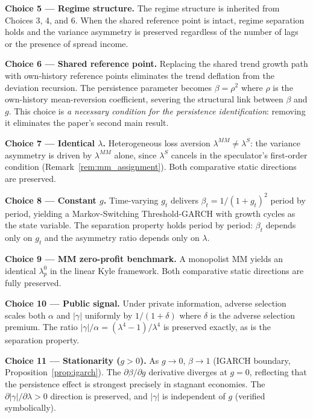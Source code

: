\documentclass[12pt,a4paper]{article}
\theoremstyle{definition}
\begin{document}
\noindent\textbf{Choice 5 --- Regime structure.} The regime structure is
inherited from Choices 3, 4, and 6. When the shared reference point is
intact, regime separation holds and the variance asymmetry is preserved
regardless of the number of lags or the presence of spread income.

\noindent\textbf{Choice 6 --- Shared reference point.} Replacing the
shared trend growth path with own-history reference points eliminates
the trend deflation from the deviation recursion. The
persistence parameter becomes $\beta = \rho^2$ where $\rho$ is the
own-history mean-reversion coefficient, severing the structural link
between $\beta$ and $g$. This choice is \emph{a necessary condition for the
persistence identification}: removing it eliminates the paper's second
main result.

\noindent\textbf{Choice 7 --- Identical $\lambda$.} Heterogeneous loss
aversion $\lambda^{MM} \neq \lambda^S$: the variance asymmetry is driven
by $\lambda^{MM}$ alone, since $\lambda^S$ cancels in the speculator's
first-order condition (Remark~\ref{rem:mm_assignment}). Both comparative
static directions are preserved.

\noindent\textbf{Choice 8 --- Constant $g$.} Time-varying $g_t$
delivers $\beta_t = 1/(1+g_t)^2$ period by period, yielding a
Markov-Switching Threshold-GARCH with growth cycles as the state variable.
The separation property holds period by period: $\beta_t$ depends only
on $g_t$ and the asymmetry ratio depends only on $\lambda$.

\noindent\textbf{Choice 9 --- MM zero-profit benchmark.} A monopolist MM
yields an identical $\lambda^0_p$ in the linear Kyle framework. Both
comparative static directions are fully preserved.

\noindent\textbf{Choice 10 --- Public signal.} Under private information,
adverse selection scales both $\alpha$ and $|\gamma|$ uniformly by
$1/(1+\delta)$ where $\delta$ is the adverse selection premium. The
ratio $|\gamma|/\alpha = (\lambda^4-1)/\lambda^4$ is preserved
exactly, as is the separation property.

\noindent\textbf{Choice 11 --- Stationarity ($g > 0$).} As $g \to 0$,
$\beta \to 1$ (IGARCH boundary, Proposition~\ref{prop:igarch}). The
$\partial\beta/\partial g$ derivative diverges at $g = 0$, reflecting
that the persistence effect is strongest precisely in stagnant economies.
The $\partial|\gamma|/\partial\lambda > 0$ direction is preserved, and
$|\gamma|$ is independent of $g$ (verified symbolically).
\end{document}
